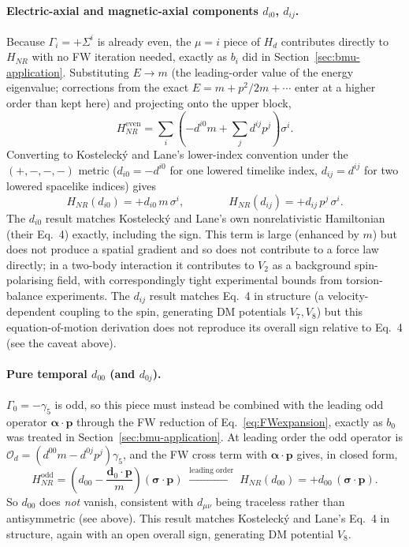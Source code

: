 \documentclass[main]{subfiles}
\begin{document}
\paragraph{Electric-axial and magnetic-axial components $d_{i0}$, $d_{ij}$.}
Because $\Gamma_i=+\Sigma^i$ is already even, the $\mu=i$ piece of $H_d$
contributes directly to $H_{NR}$ with no FW iteration needed, exactly as
$b_i$ did in Section~\ref{sec:bmu-application}. Substituting $E\to m$ (the
leading-order value of the energy eigenvalue; corrections from the exact
$E=m+p^2/2m+\cdots$ enter at a higher order than kept here) and projecting
onto the upper block,
\begin{equation}
  H_{NR}^{\text{even}} = \sum_i\left(-d^{i0}m + \sum_j d^{ij}p^j\right)\sigma^i.
\end{equation}
Converting to Kostelecký and Lane's lower-index convention under the
$(+,-,-,-)$ metric ($d_{i0}=-d^{i0}$ for one lowered timelike index,
$d_{ij}=d^{ij}$ for two lowered spacelike indices) gives
\begin{equation}
  H_{NR}(d_{i0}) = +d_{i0}\,m\,\sigma^i, \qquad\qquad
  H_{NR}(d_{ij}) = +d_{ij}\,p^j\,\sigma^i .
\end{equation}
The $d_{i0}$ result matches Kostelecký and Lane's own nonrelativistic
Hamiltonian (their Eq.~4) exactly, including the sign. This term is large
(enhanced by $m$) but does not produce a spatial gradient and so does not
contribute to a force law directly; in a two-body interaction it
contributes to $V_2$ as a background spin-polarising field, with
correspondingly tight experimental bounds from torsion-balance experiments.
The $d_{ij}$ result matches Eq.~4 in structure (a velocity-dependent
coupling to the spin, generating DM potentials $V_7,V_8$) but this
equation-of-motion derivation does not reproduce its overall sign relative
to Eq.~4 (see the caveat above).

\paragraph{Pure temporal $d_{00}$ (and $d_{0j}$).} $\Gamma_0=-\gamma_5$ is
odd, so this piece must instead be combined with the leading odd operator
$\boldsymbol\alpha\cdot\mathbf p$ through the FW reduction of
Eq.~\eqref{eq:FWexpansion}, exactly as $b_0$ was treated in
Section~\ref{sec:bmu-application}. At leading order the odd operator is
$\mathcal O_d = (d^{00}m - d^{0j}p^j)\gamma_5$, and the FW cross term with
$\boldsymbol\alpha\cdot\mathbf p$ gives, in closed form,
\begin{equation}
  H_{NR}^{\text{odd}} = \left(d_{00} - \frac{\mathbf d_0\cdot\mathbf p}{m}\right)
  (\boldsymbol\sigma\cdot\mathbf p)
  \;\xrightarrow{\text{leading order}}\;
  H_{NR}(d_{00}) = +d_{00}\,(\boldsymbol\sigma\cdot\mathbf p).
\end{equation}
So $d_{00}$ does \emph{not} vanish, consistent with $d_{\mu\nu}$ being
traceless rather than antisymmetric (see above). This result matches
Kostelecký and Lane's Eq.~4 in structure, again with an open overall sign,
generating DM potential $V_8$.
\end{document}
